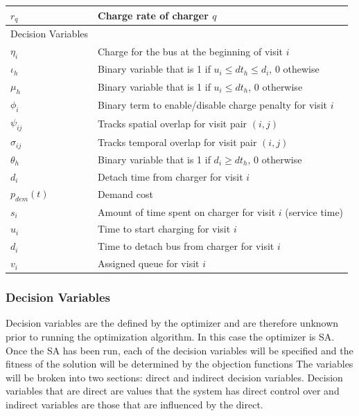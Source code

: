 \documentclass[11pt,a4paper,final]{article}
\begin{document}
\begin{table}[htbp]
\begin{tabular}{ll}
\(r_q\) & Charge rate of charger \(q\)\\[0pt]
\hline
Decision Variables & \\[0pt]
\(\eta_i\) & Charge for the bus at the beginning of visit \(i\)\\[0pt]
\(\iota_h\) & Binary variable that is 1 if \(u_i \le dt_h \le d_i\), 0 othewise\\[0pt]
\(\mu_h\) & Binary variable that is 1 if \(u_i \le dt_h\), 0 otherwise\\[0pt]
\(\phi_i\) & Binary term to enable/disable charge penalty for visit \(i\)\\[0pt]
\(\psi_{ij}\) & Tracks spatial overlap for visit pair \((i,j)\)\\[0pt]
\(\sigma_{ij}\) & Tracks temporal overlap for visit pair \((i,j)\)\\[0pt]
\(\theta_h\) & Binary variable that is 1 if \(d_i \ge dt_h\), 0 otherwise\\[0pt]
\(d_i\) & Detach time from charger for visit \(i\)\\[0pt]
\(p_{dem}(t)\) & Demand cost\\[0pt]
\(s_i\) & Amount of time spent on charger for visit \(i\) (service time)\\[0pt]
\(u_i\) & Time to start charging for visit \(i\)\\[0pt]
\(d_i\) & Time to detach bus from charger for visit \(i\)\\[0pt]
\(v_i\) & Assigned queue for visit \(i\)\\[0pt]
\hline
\end{tabular}
\end{table}

\subsubsection{Decision Variables}
\label{sec:decision-variables}
Decision variables are the defined by the optimizer and are therefore unknown prior to running the optimization
algorithm. In this case the optimizer is SA. Once the SA has been run, each of the decision variables will be specified and
the fitness of the solution will be determined by the objection functions The variables will be broken into two
sections: direct and indirect decision variables. Decision variables that are direct are values that the system has
direct control over and indirect variables are those that are influenced by the direct.
\end{document}
